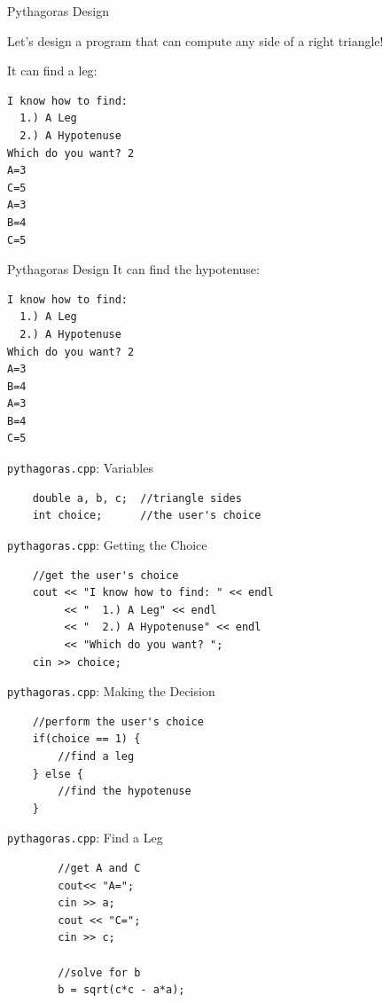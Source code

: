 \documentclass[]{beamer}
\begin{document}
\begin{frame}[fragile]{Pythagoras Design}

    Let's design a program that can compute any side of a right
    triangle! 

        It can find a leg:
\begin{verbatim}
I know how to find: 
  1.) A Leg
  2.) A Hypotenuse
Which do you want? 2
A=3
C=5
A=3
B=4
C=5
\end{verbatim}
\end{frame}

\begin{frame}[fragile]{Pythagoras Design}
        It can find the hypotenuse:
\begin{verbatim}
I know how to find: 
  1.) A Leg
  2.) A Hypotenuse
Which do you want? 2
A=3
B=4
A=3
B=4
C=5
\end{verbatim}
\end{frame}

\begin{frame}[fragile]{\texttt{pythagoras.cpp}: Variables}
\begin{verbatim}
    double a, b, c;  //triangle sides
    int choice;      //the user's choice
\end{verbatim}
\end{frame}

\begin{frame}[fragile]{\texttt{pythagoras.cpp}: Getting the Choice}
\begin{verbatim}
    //get the user's choice
    cout << "I know how to find: " << endl
         << "  1.) A Leg" << endl
         << "  2.) A Hypotenuse" << endl
         << "Which do you want? ";
    cin >> choice;
\end{verbatim}
\end{frame}

\begin{frame}[fragile]{\texttt{pythagoras.cpp}: Making the Decision}
\begin{verbatim}
    //perform the user's choice
    if(choice == 1) {
        //find a leg
    } else {
        //find the hypotenuse
    }
\end{verbatim}
\end{frame}

\begin{frame}[fragile]{\texttt{pythagoras.cpp}: Find a Leg}
\begin{verbatim}
        //get A and C
        cout<< "A=";
        cin >> a;
        cout << "C=";
        cin >> c;

        //solve for b
        b = sqrt(c*c - a*a);
\end{verbatim}
\end{frame}
\end{document}
